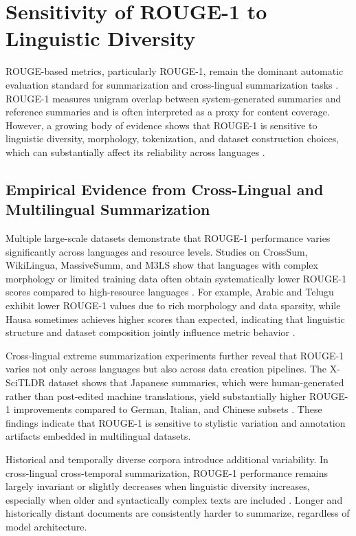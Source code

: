 \section{Sensitivity of ROUGE-1 to Linguistic Diversity}

ROUGE-based metrics, particularly ROUGE-1, remain the dominant automatic evaluation standard for summarization and cross-lingual summarization tasks \citep{wang2022survey}. ROUGE-1 measures unigram overlap between system-generated summaries and reference summaries and is often interpreted as a proxy for content coverage. However, a growing body of evidence shows that ROUGE-1 is sensitive to linguistic diversity, morphology, tokenization, and dataset construction choices, which can substantially affect its reliability across languages \citep{ganesan2018rouge2, mondshine2025beyond}.

\subsection{Empirical Evidence from Cross-Lingual and Multilingual Summarization}

Multiple large-scale datasets demonstrate that ROUGE-1 performance varies significantly across languages and resource levels. Studies on CrossSum, WikiLingua, MassiveSumm, and M3LS show that languages with complex morphology or limited training data often obtain systematically lower ROUGE-1 scores compared to high-resource languages \citep{varab2021massivesumm, verma2023m3ls, parnell2024sumtra}. For example, Arabic and Telugu exhibit lower ROUGE-1 values due to rich morphology and data sparsity, while Hausa sometimes achieves higher scores than expected, indicating that linguistic structure and dataset composition jointly influence metric behavior \citep{varab2021massivesumm}.

Cross-lingual extreme summarization experiments further reveal that ROUGE-1 varies not only across languages but also across data creation pipelines. The X-SciTLDR dataset shows that Japanese summaries, which were human-generated rather than post-edited machine translations, yield substantially higher ROUGE-1 improvements compared to German, Italian, and Chinese subsets \citep{takeshita2022xscitldr, takeshita2024xscitldr}. These findings indicate that ROUGE-1 is sensitive to stylistic variation and annotation artifacts embedded in multilingual datasets.

Historical and temporally diverse corpora introduce additional variability. In cross-lingual cross-temporal summarization, ROUGE-1 performance remains largely invariant or slightly decreases when linguistic diversity increases, especially when older and syntactically complex texts are included \citep{zhang2024crosstemporal}. Longer and historically distant documents are consistently harder to summarize, regardless of model architecture.

